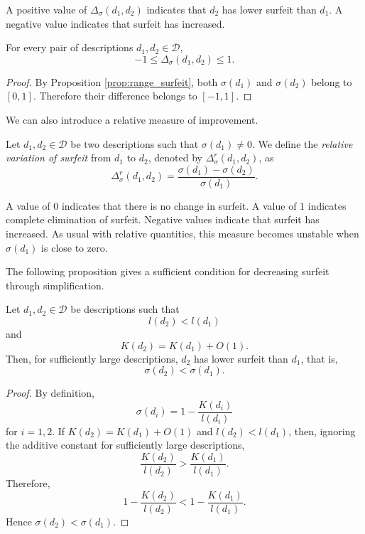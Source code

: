 A positive value of \(\Delta_\sigma(d_1,d_2)\) indicates that \(d_2\) has lower surfeit than \(d_1\). A negative value indicates that surfeit has increased.

\begin{proposition}
\label{prop:variation_surfeit_range}
For every pair of descriptions \(d_1,d_2\in\mathcal D\),
\[
-1\leq \Delta_\sigma(d_1,d_2)\leq 1.
\]
\end{proposition}

\begin{proof}
By Proposition \ref{prop:range_surfeit}, both \(\sigma(d_1)\) and \(\sigma(d_2)\) belong to \([0,1]\). Therefore their difference belongs to \([-1,1]\).
\end{proof}

We can also introduce a relative measure of improvement.

\begin{definition}
Let \(d_1,d_2\in\mathcal D\) be two descriptions such that \(\sigma(d_1)\neq 0\). We define the \emph{relative variation of surfeit} from \(d_1\) to \(d_2\), denoted by \(\Delta^r_\sigma(d_1,d_2)\), as
\[
\Delta^r_\sigma(d_1,d_2)
=
\frac{\sigma(d_1)-\sigma(d_2)}{\sigma(d_1)}.
\]
\end{definition}

A value of \(0\) indicates that there is no change in surfeit. A value of \(1\) indicates complete elimination of surfeit. Negative values indicate that surfeit has increased. As usual with relative quantities, this measure becomes unstable when \(\sigma(d_1)\) is close to zero.

The following proposition gives a sufficient condition for decreasing surfeit through simplification.

\begin{proposition}
\label{prop:surfeit_decrease_sufficient}
Let \(d_1,d_2\in\mathcal D\) be descriptions such that
\[
l(d_2)<l(d_1)
\]
and
\[
K(d_2)=K(d_1)+O(1).
\]
Then, for sufficiently large descriptions, \(d_2\) has lower surfeit than \(d_1\), that is,
\[
\sigma(d_2)<\sigma(d_1).
\]
\end{proposition}

\begin{proof}
By definition,
\[
\sigma(d_i)=1-\frac{K(d_i)}{l(d_i)}
\]
for \(i=1,2\). If \(K(d_2)=K(d_1)+O(1)\) and \(l(d_2)<l(d_1)\), then, ignoring the additive constant for sufficiently large descriptions,
\[
\frac{K(d_2)}{l(d_2)}
>
\frac{K(d_1)}{l(d_1)}.
\]
Therefore,
\[
1-\frac{K(d_2)}{l(d_2)}
<
1-\frac{K(d_1)}{l(d_1)}.
\]
Hence \(\sigma(d_2)<\sigma(d_1)\).
\end{proof}


